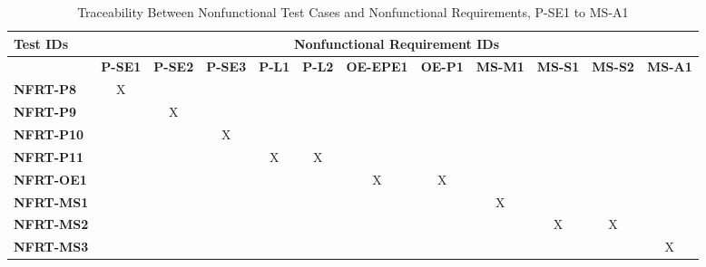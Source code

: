 \documentclass[12pt, titlepage]{article}
\begin{document}
\begin{landscape}
			\begin{longtable}{|l|ccccccccccc|}
	\caption{Traceability Between Nonfunctional Test Cases and Nonfunctional Requirements, P-SE1 to MS-A1}                                                                                                                                                                                                                           \\
		\hline
		\textbf{Test IDs}   & \multicolumn{11}{c|}{\textbf{Nonfunctional Requirement IDs}}                                                                                                                                                                                                                 \\
		\hline
		~                   & \textbf{P-SE1} & \textbf{P-SE2} & \textbf{P-SE3} & \textbf{P-L1} & \textbf{P-L2} & \textbf{OE-EPE1} & \textbf{OE-P1} & \textbf{MS-M1} & \textbf{MS-S1} & \textbf{MS-S2} & \textbf{MS-A1}  \\
		\hline
		\textbf{NFRT-P8} & X                                                         & ~             & ~             & ~             & ~             & ~             & ~             & ~             & ~             & ~ &~\\
		\textbf{NFRT-P9} & ~                                                         & X             & ~             & ~             & ~             & ~             & ~             & ~             & ~             & ~ &~\\
		\textbf{NFRT-P10} & ~                                                         & ~             & X             & ~             & ~             & ~             & ~             & ~             & ~             & ~ &~\\
		\textbf{NFRT-P11} & ~                                                         & ~             & ~             & X             & X             & ~             & ~             & ~             & ~             & ~ &~\\
		\textbf{NFRT-OE1} & ~                                                         & ~             & ~             & ~             & ~             & X             & X             & ~             & ~             & ~ &~\\
		\textbf{NFRT-MS1} & ~                                                         & ~             & ~             & ~             & ~             & ~             & ~             & X             & ~             & ~ &~\\
		\textbf{NFRT-MS2} & ~                                                         & ~             & ~             & ~             & ~             & ~             & ~             & ~             & X             &X  &~\\
		\textbf{NFRT-MS3} & ~                                                         & ~             & ~             & ~             & ~             & ~             & ~             & ~             & ~             &~  &X\\
		\hline
	\end{longtable}
	

\end{landscape}
\end{document}
